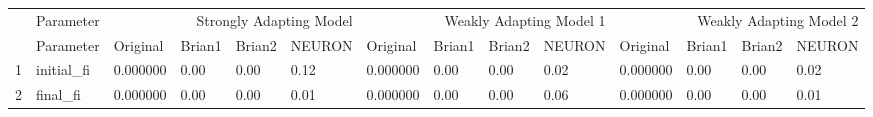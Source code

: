 \begin{tabular}{llllllllllllll}
 & Parameter & \multicolumn{4}{r}{Strongly Adapting Model} & \multicolumn{4}{r}{Weakly Adapting Model 1} & \multicolumn{4}{r}{Weakly Adapting Model 2} \\
 & Parameter & Original & Brian1 & Brian2 & NEURON & Original & Brian1 & Brian2 & NEURON & Original & Brian1 & Brian2 & NEURON \\
1 & initial_fi & 0.000000 & 0.00 & 0.00 & 0.12 & 0.000000 & 0.00 & 0.00 & 0.02 & 0.000000 & 0.00 & 0.00 & 0.02 \\
2 & final_fi & 0.000000 & 0.00 & 0.00 & 0.01 & 0.000000 & 0.00 & 0.00 & 0.06 & 0.000000 & 0.00 & 0.00 & 0.01 \\
\end{tabular}
